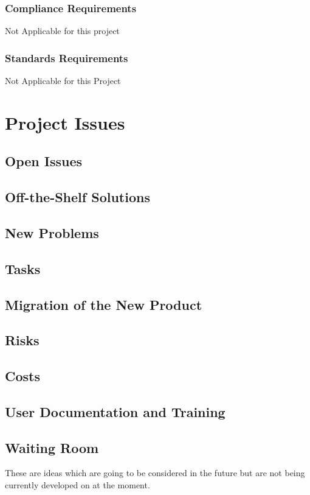 \documentclass[12pt]{article}
\begin{document}
\subsubsection*{Compliance Requirements}
Not Applicable for this project
\subsubsection*{Standards Requirements}
Not Applicable for this Project

\section{Project Issues}

\subsection{Open Issues}

\subsection{Off-the-Shelf Solutions}

\subsection{New Problems}

\subsection{Tasks}

\subsection{Migration of the New Product}

\subsection{Risks}

\subsection{Costs}

\subsection{User Documentation and Training}

\subsection{Waiting Room}
These are ideas which are going to be considered in the future but are not being currently developed on at the moment.
\end{document}
